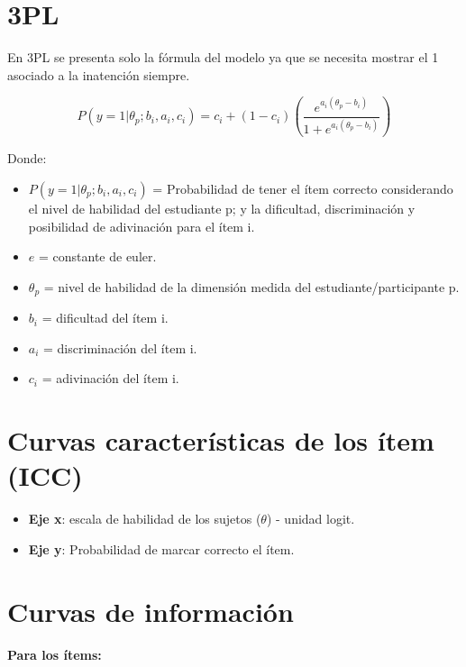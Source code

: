 \documentclass[
  letterpaper,
  DIV=11,
  numbers=noendperiod]{scrreprt}
\begin{document}
\section{3PL}\label{pl-1}

En 3PL se presenta solo la fórmula del modelo ya que se necesita mostrar
el 1 asociado a la inatención siempre.

\[
P(y=1|\theta_p;b_i,a_i,c_i) = c_i + (1-c_i) \left(\frac{e^{a_i(\theta_p-b_i)}}{1 + e^{a_i(\theta_p-b_i)}}\right)
\]

Donde:

\begin{itemize}
\item
  \(P(y=1|\theta_p;b_i,a_i,c_i)\) = Probabilidad de tener el ítem
  correcto considerando el nivel de habilidad del estudiante p; y la
  dificultad, discriminación y posibilidad de adivinación para el ítem
  i.
\item
  \(e\) = constante de euler.
\item
  \(\theta_p\) = nivel de habilidad de la dimensión medida del
  estudiante/participante p.
\item
  \(b_i\) = dificultad del ítem i.
\item
  \(a_i\) = discriminación del ítem i.
\item
  \(c_i\) = adivinación del ítem i.
\end{itemize}

\section{Curvas características de los ítem
(ICC)}\label{curvas-caracteruxedsticas-de-los-uxedtem-icc}

\begin{itemize}
\item
  \textbf{Eje x}: escala de habilidad de los sujetos (\(\theta\)) -
  unidad logit.
\item
  \textbf{Eje y}: Probabilidad de marcar correcto el ítem.
\end{itemize}

\section{Curvas de información}\label{curvas-de-informaciuxf3n}

\textbf{Para los ítems:}
\end{document}
